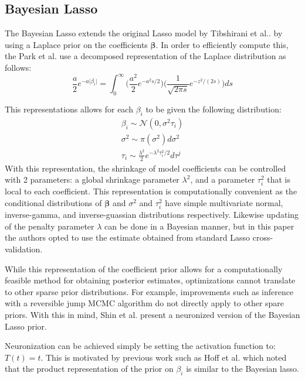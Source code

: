 \subsection{Bayesian Lasso}

The Bayesian Lasso \cite{park2008bayesian} extends the original Lasso model by Tibshirani et al.\cite{tibshirani1996regression}. by using a Laplace prior on the coefficients $\boldsymbol{\beta}$.
In order to efficiently compute this, the Park et al. use a decomposed representation of the Laplace distribution as follows:
\begin{equation}
    \frac{a}{2}e^{-a\vert \beta_i \vert} =
    \int_0^\infty 
     \Big(\frac{a^2}{2}e^{-a^2s/2}\Big)
    \Big(\frac{1}{\sqrt{2\pi s}}e^{-z^2/(2s)}\Big)
    ds
\end{equation}

This representations allows for each $\beta_i$ to be given the following distribution:
\begin{align*}
    \beta_i \sim \mathcal{N}(0, \sigma^2 \tau_i)\\
    \sigma^2 \sim \pi(\sigma^2)d\sigma^2\\
    \tau_i \sim \frac{\lambda^2}{2} e^{-\lambda^2\tau^2_i/2}d\tau^j
\end{align*} 
With this representation, the shrinkage of model coefficients can be controlled with 2 parameters:
a global shrinkage parameter $\lambda^2$, and a parameter $\tau^2_i$ that is local to each coefficient.
This representation is computationally convenient as the conditional distributions of $\boldsymbol{\beta}$ and $\sigma^2$ and $\tau^2_i$ have simple multivariate normal, inverse-gamma, and inverse-guassian distributions respectively.
Likewise updating of the penalty parameter $\lambda$ can be done in a Bayesian manner, but in this paper the authors opted to use the estimate obtained from standard Lasso cross-validation.

While this representation of the coefficient prior allows for a computationally feasible method for obtaining posterior estimates, optimizations cannot translate to other sparse prior distributions.
For example, improvements such as inference with a reversible jump MCMC algorithm \cite{chen2011bayesian} do not directly apply to other spare priors.
With this in mind, Shin et al. present a neuronized version of the Bayesian Lasso prior.

Neuronization can be achieved simply be setting the activation function to: $T(t)=t$. 
This is motivated by previous work such as Hoff et al. \cite{hoff2017lasso} which noted that the product representation of the prior on $\beta_i$ is similar to the Bayesian lasso.



